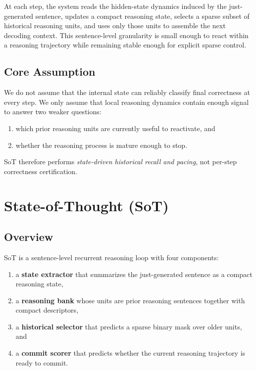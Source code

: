 \documentclass{article}
\begin{document}
At each step, the system reads the hidden-state dynamics induced by the just-generated sentence, updates a compact reasoning state, selects a sparse subset of historical reasoning units, and uses only those units to assemble the next decoding context. This sentence-level granularity is small enough to react within a reasoning trajectory while remaining stable enough for explicit sparse control.

\subsection{Core Assumption}
We do not assume that the internal state can reliably classify final correctness at every step. We only assume that local reasoning dynamics contain enough signal to answer two weaker questions:
\begin{enumerate}[leftmargin=1.3em, itemsep=0.2em]
    \item which prior reasoning units are currently useful to reactivate, and
    \item whether the reasoning process is mature enough to stop.
\end{enumerate}
SoT therefore performs \emph{state-driven historical recall and pacing}, not per-step correctness certification.

\section{State-of-Thought (SoT)}
\label{sec:method}

\subsection{Overview}
SoT is a sentence-level recurrent reasoning loop with four components:
\begin{enumerate}[leftmargin=1.3em, itemsep=0.2em]
    \item a \textbf{state extractor} that summarizes the just-generated sentence as a compact reasoning state,
    \item a \textbf{reasoning bank} whose units are prior reasoning sentences together with compact descriptors,
    \item a \textbf{historical selector} that predicts a sparse binary mask over older units, and
    \item a \textbf{commit scorer} that predicts whether the current reasoning trajectory is ready to commit.
\end{enumerate}
\end{document}
